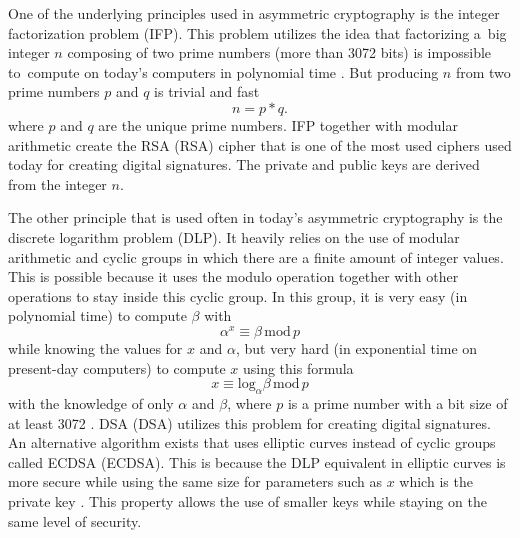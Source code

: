 One of the underlying principles used in asymmetric cryptography is the integer factorization problem (\acs{IFP}). This problem utilizes the idea that factorizing a~big integer $n$ composing of two prime numbers (more than 3072 bits) is impossible to~compute on today's computers in polynomial time \cite{Paar2010}. But producing $n$ from two prime numbers $p$ and $q$ is trivial and fast
\begin{equation}
  n=p*q.
\end{equation}
where $p$ and $q$ are the unique prime numbers. IFP together with modular arithmetic create the RSA (\acl{RSA}) cipher that is one of the most used ciphers used today for creating digital signatures. The private and public keys are derived from the integer $n$.

The other principle that is used often in today's asymmetric cryptography is the discrete logarithm problem (\acs{DLP}). It heavily relies on the use of modular arithmetic and cyclic groups in which there are a finite amount of integer values. This is possible because it uses the modulo operation together with other operations to stay inside this cyclic group. In this group, it is very easy (in polynomial time) to compute $\beta$ with
\begin{equation}
  \alpha^x\equiv\beta\,\mathrm{mod}\,p
\end{equation}
while knowing the values for $x$ and $\alpha$, but very hard (in exponential time on present-day computers) to compute $x$ using this formula
\begin{equation}
  x\equiv\mathrm{log}_\alpha\beta\,\mathrm{mod}\,p
\end{equation}
with the knowledge of only $\alpha$ and $\beta$, where $p$ is a prime number with a bit size of at least 3072 \cite{Paar2010}. DSA (\acl{DSA}) utilizes this problem for creating digital signatures. An alternative algorithm exists that uses elliptic curves instead of cyclic groups called ECDSA (\acl{ECDSA}). This is because the DLP equivalent in elliptic curves is more secure while using the same size for parameters such as $x$ which is the private key \cite{Ristic2014}. This property allows the use of smaller keys while staying on the same level of security.
